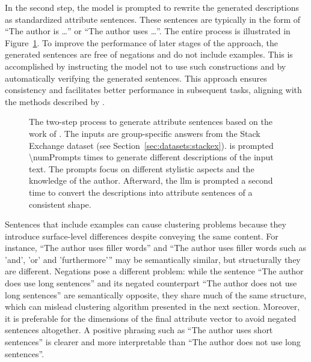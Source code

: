 In the second step, the model is prompted to rewrite the generated descriptions as standardized attribute sentences. These sentences are typically in the form of \enquote{The author is \ldots} or \enquote{The author uses \ldots}. The entire process is illustrated in Figure~\ref{fig:attributeSentenceGeneration}. To improve the performance of later stages of the approach, the generated sentences are free of negations and do not include examples. This is accomplished by instructing the model not to use such constructions and by automatically verifying the generated sentences. This approach ensures consistency and facilitates better performance in subsequent tasks, aligning with the methods described by \citet{patelLearningInterpretableStyle2023}.

\begin{figure}[h!t]
  
  \caption{The two-step process to generate attribute sentences based on the work of \citet{patelLearningInterpretableStyle2023}. The inputs are group-specific answers from the Stack Exchange dataset (see Section~\ref{sec:datasets:stackex}).  is prompted \num{\numPrompts} times to generate different descriptions of the input text. The prompts focus on different stylistic aspects and the knowledge of the author. Afterward, the \ac{llm} is prompted a second time to convert the descriptions into attribute sentences of a consistent shape.}%
  \label{fig:attributeSentenceGeneration}
\end{figure}

Sentences that include examples can cause clustering problems because they introduce surface-level differences despite conveying the same content. For instance, \enquote{The author uses filler words} and \enquote{The author uses filler words such as 'and', 'or' and 'furthermore'} may be semantically similar, but structurally they are different. Negations pose a different problem: while the sentence \enquote{The author does use long sentences} and its negated counterpart \enquote{The author does not use long sentences} are semantically opposite, they share much of the same structure, which can mislead clustering algorithm presented in the next section. Moreover, it is preferable for the dimensions of the final attribute vector to avoid negated sentences altogether. A positive phrasing such as \enquote{The author uses short sentences} is clearer and more interpretable than \enquote{The author does not use long sentences}. %

